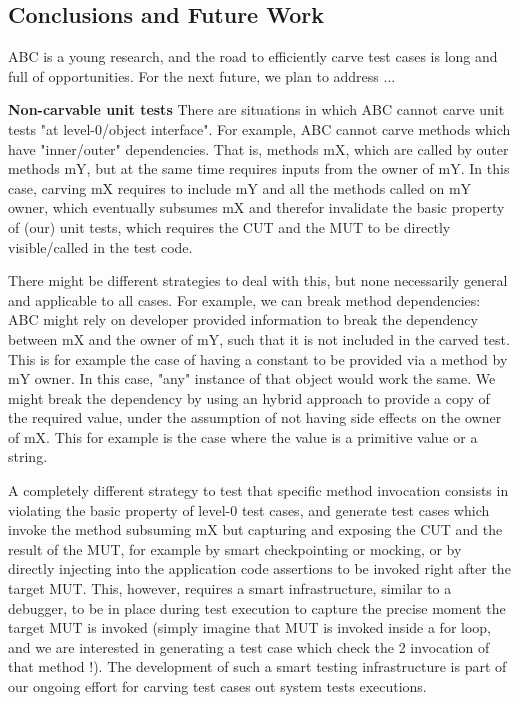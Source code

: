 \documentclass[10pt,conference]{IEEEtran}
\newcommand{\abc}{\textsf{ABC}\xspace}
\begin{document}

\subsection{Conclusions and Future Work}


\abc is a young research, and the road to efficiently carve test cases is long and full of opportunities.
For the next future, we plan to address ...

\textbf{Non-carvable unit tests}
There are situations in which \abc cannot carve unit tests "at level-0/object interface". For example, \abc cannot carve methods which have "inner/outer" dependencies. That is, methods mX, which are called by outer methods mY, but at the same time requires inputs from the owner of mY. In this case, carving mX requires to include mY and all the methods called on mY owner, which eventually subsumes mX and therefor invalidate the basic property of (our) unit tests, which requires the CUT and the MUT to be directly visible/called in the test code. 

There might be different strategies to deal with this, but none necessarily general and applicable to all cases.
For example, we can break method dependencies: \abc might rely on developer provided information to break the dependency between mX and the owner of mY, such that it is not included in the carved test. This is for example the case of having a constant to be provided via a method by mY owner. In this case, "any" instance of that object would work the same. We might break the dependency by using an hybrid approach to provide a copy of the required value, under the assumption of not having side effects on the owner of mX. This for example is the case where the value is a primitive value or a string. 

A completely different strategy to test that specific method invocation consists in violating the basic property of level-0 test cases, and generate test cases which invoke the method subsuming mX but capturing and exposing the CUT and the result of the MUT, for example by smart checkpointing or mocking, or by directly injecting into the application code assertions to be invoked right after the target MUT. This, however, requires a smart infrastructure, similar to a debugger, to be in place during test execution to capture the precise moment the target MUT is invoked (simply imagine that MUT is invoked inside a for loop, and we are interested in generating a test case which check the 2 invocation of that method !). The development of such a smart testing infrastructure is part of our ongoing effort for carving test cases out system tests executions. 
\end{document}
